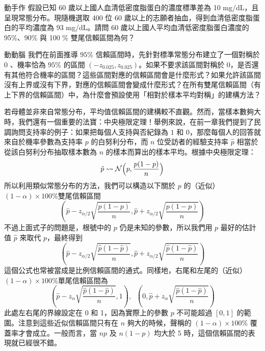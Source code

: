     \bigskip

    \begin{custom}{動手作}
       假設已知 60 歲以上國人血清低密度脂蛋白的濃度標準差為 10 mg/dL，且呈現常態分布。現隨機選取 400 位 60 歲以上的志願者抽血，得到血清低密度脂蛋白的平均濃度為 93 mg/dL。請問 60 歲以上國人平均血清低密度脂蛋白濃度的95\%、90\% 與 100 \% 雙尾信賴區間為何？
    \end{custom}

    \answerbox{140pt}

    \bigskip

    \begin{custom}{動動腦}
        我們在前面推導 $95\%$ 信賴區間時，先針對標準常態分布建立了一個對稱於 $0$ 、機率恰為 $95\%$ 的區間 $(-z_{0.025}, z_{0.025})$。如果不要求該區間對稱於 $0$，是否還有其他符合機率的區間？這些區間對應的信賴區間會是什麼形式？如果允許該區間沒有上界或沒有下界，對應的信賴區間會變成什麼形式？在所有雙尾信賴區間（有上下界的信賴區間）中，為什麼會預設使用「相對於樣本平均對稱」的建構方法？
    \end{custom}

    \answerbox{312pt}

    \bigskip

    若母體並非來自常態分布，平均值信賴區間的建構較不直觀。然而，當樣本數夠大時，我們還有一個重要的法寶：中央極限定理！舉例來說，在前一章我們提到了民調詢問支持率的例子：如果把每個人支持與否紀錄為 $1$ 和 $0$，那麼每個人的回答就來自於機率參數為支持率 $p$ 的白努利分布，而 $n$ 位受訪者的經驗支持率 $\hat{p}$ 相當於從該白努利分布抽取樣本數為 $n$ 的樣本而算出的樣本平均。根據中央極限定理：
    \smallskip
    \[\hat{p} \leadsto \mathcal{N}\Big(p, \frac{p(1-p)}{n}\Big)\]
    \smallskip
    所以利用類似常態分布的方法，我們可以構造以下關於 $p$ 的（近似） $(1-\alpha)\times 100\%$雙尾信賴區間
    \smallskip
    \[\left(\hat{p} - z_{\alpha/2} \sqrt{\frac{p(1-p)}{n}}, \hat{p} + z_{\alpha/2} \sqrt{\frac{p(1-p)}{n}}\right)\]
    \smallskip
    不過上面式子的問題是，根號中的 $p$ 仍是未知的參數，所以我們用 $p$ 最好的估計值 $\hat{p}$ 來取代 $p$，最終得到
    \smallskip
    \[\left(\hat{p} - z_{\alpha/2} \sqrt{\frac{\hat{p}(1-\hat{p})}{n}}, \hat{p} + z_{\alpha/2} \sqrt{\frac{\hat{p}(1-\hat{p})}{n}}\right)\]
    \smallskip
    這個公式也常被當成是比例信賴區間的通式。同樣地，右尾和左尾的（近似） $(1-\alpha)\times 100\%$單尾信賴區間為
    \smallskip
    \[\left(\hat{p} - z_{\alpha} \sqrt{\frac{\hat{p}(1-\hat{p})}{n}}, 1\right), \;\; \left(0, \hat{p} + z_{\alpha} \sqrt{\frac{\hat{p}(1-\hat{p})}{n}}\right)\]
    \smallskip
    此處左右尾的界線設定在 0 和 1，因為實際上的參數 $p$ 不可能超過 $[0,1]$ 的範圍。注意到這些近似信賴區間只有在 $n$ 夠大的時候，聲稱的 $(1-\alpha)\times 100\%$ 覆蓋率才會成立。一般而言，當 $np$ 及 $n(1-p)$ 均大於 $5$ 時，這個信賴區間的表現就已經很不錯。

